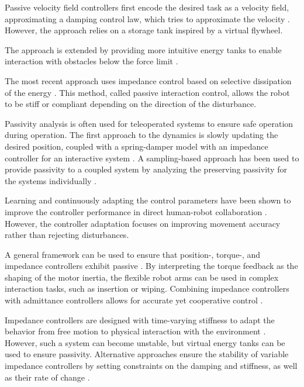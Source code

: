 \documentclass[conference]{IEEEtran}
\begin{document}
Passive velocity field controllers first encode the desired task as a velocity field, approximating a damping control law, which tries to approximate the velocity \cite{li1999passive,}. However, the approach relies on a storage tank inspired by a virtual flywheel.

The approach is extended by providing more intuitive energy tanks to enable interaction with obstacles below the force limit \cite{kishi2003passive}.

The most recent approach uses impedance control based on selective dissipation of the energy \cite{kronander2015passive}. This method, called passive interaction control, allows the robot to be stiff or compliant depending on the direction of the disturbance.

Passivity analysis is often used for teleoperated systems to ensure safe operation during operation.
The first approach to the dynamics is slowly updating the desired position, coupled with a spring-damper model with an impedance controller for an interactive system
\cite{lee2010passive}.
A sampling-based approach has been used to provide passivity to a coupled system by analyzing the preserving passivity for the systems individually \cite{stramigioli2005sampled}.

Learning and continuously adapting the control parameters have been shown to improve the controller performance in direct human-robot collaboration
\cite{gribovskaya2011motion}.
However, the controller adaptation focuses on improving movement accuracy rather than rejecting disturbances.

A general framework can be used to ensure that position-, torque-, and impedance controllers exhibit passive \cite{albu2007unified}. By interpreting the torque feedback as the shaping of the motor inertia, the flexible robot arms can be used in complex interaction tasks, such as insertion or wiping.
Combining impedance controllers with admittance controllers allows for accurate yet cooperative control
\cite{fujiki2022series}.


Impedance controllers are designed with time-varying stiffness to adapt the behavior from free motion to physical interaction with the environment  \cite{ferraguti2013tank}. However, such a system can become unstable, but virtual energy tanks can be used to ensure passivity.
Alternative approaches ensure the stability of variable impedance controllers by setting constraints on the damping and stiffness, as well as their rate of change \cite{kronander2016stability}.
\end{document}
